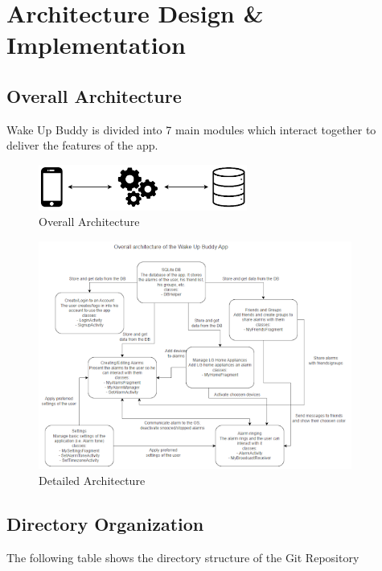 \documentclass[conference]{IEEEtran}
\begin{document}
\section{Architecture Design \& Implementation}
\subsection{Overall Architecture}
Wake Up Buddy is divided into 7 main modules which interact together to deliver the features of the app.

\begin{figure}[htbp]
    \centerline{\includegraphics[height=15mm,scale=0.5]{Images/architecture_brief.png}}
    \caption{Overall Architecture}
    \label{fig}
\end{figure}
    
\begin{figure}[htbp]
    \centerline{\includegraphics[height=75mm,scale=0.5]{Images/architecture.png}}
    \caption{Detailed Architecture}
    \label{fig}
\end{figure}
    
\subsection{Directory Organization}
The following table shows the directory structure of the Git Repository
\end{document}
